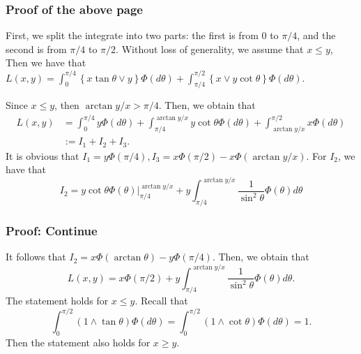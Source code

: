 \documentclass[11pt]{beamer}
\newcommand{\set}[1]{\left\{#1\right\}}
\begin{document}
\begin{frame}
	\frametitle{Proof of the above page}
First, we split the integrate into two parts: the first is from $0$ to $\pi/4$, and the second is from $\pi/4$ to $\pi/2$. Without loss of generality, we assume that $x\le y$, Then we have that 
$L(x,y) = \int_0^{\pi/4}\set{x \tan \theta \lor y } \Phi(d\theta)+\int_{\pi/4}^{\pi/2} \set{x \lor y \cot \theta} \Phi(d\theta).$

Since $x\le y$, then $\arctan y/x >\pi/4$. Then, we obtain that 
$$
\begin{aligned}
	L(x,y)&=\int_{0}^{\pi/4} y \Phi(d\theta)+\int_{\pi/4}^{\arctan y/x}y\cot\theta\Phi(d\theta)+ \int_{\arctan y/x}^{\pi/2} x \Phi(d\theta) \\
	&:=I_1+I_2+I_3.
\end{aligned}
$$
It is obvious that $I_1=y\Phi(\pi/4), I_3=x\Phi(\pi/2)-x\Phi(\arctan y/x)$. For $I_2$, we have that 
$$
I_2=y\cot \theta \Phi(\theta)\vert_{\pi/4}^{\arctan y/x}+ y\int_{\pi/4}^{\arctan y/x}  \frac{1}{\sin^2 \theta} \Phi(\theta) d\theta
$$
\end{frame}

\begin{frame}
	\frametitle{Proof: Continue}
It follows that 
$
I_2= x \Phi(\arctan\theta)-y\Phi(\pi/4).
$
Then, we obtain that 
$$
L(x,y)=x\Phi(\pi/2)+ y\int_{\pi/4}^{\arctan y/x}  \frac{1}{\sin^2 \theta} \Phi(\theta) d\theta.
$$
The statement holds for $x\le y$.
Recall that $$\int_0^{\pi/2} (1\land \tan\theta)\Phi(d\theta)=\int_0^{\pi/2}(1\land \cot\theta)\Phi(d\theta)=1.$$
Then the statement also holds for $x\ge y$.

\end{frame}
\end{document}
